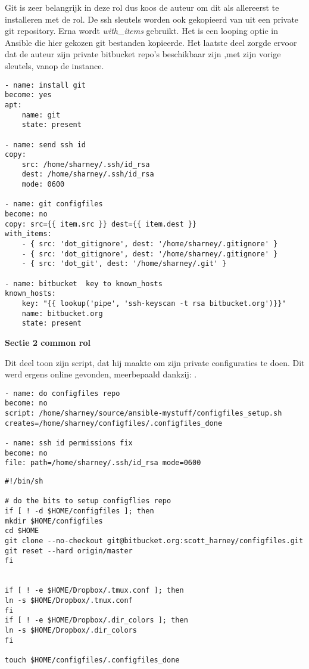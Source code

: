 Git is zeer belangrijk in deze rol dus koos de auteur om dit als allereerst te installeren met de rol. De ssh sleutels worden ook gekopieerd van uit een private git repository. Erna wordt \textit{with\_items} gebruikt. Het is een looping optie in Ansible die hier gekozen git bestanden kopieerde. Het laatste deel zorgde ervoor dat de auteur zijn private bitbucket repo's beschikbaar zijn ,met zijn vorige sleutels, vanop de instance.
\begin{lstlisting}
- name: install git
become: yes
apt:
    name: git
    state: present

- name: send ssh id
copy:
    src: /home/sharney/.ssh/id_rsa
    dest: /home/sharney/.ssh/id_rsa
    mode: 0600

- name: git configfiles
become: no
copy: src={{ item.src }} dest={{ item.dest }}
with_items:
    - { src: 'dot_gitignore', dest: '/home/sharney/.gitignore' }
    - { src: 'dot_gitignore', dest: '/home/sharney/.gitignore' }
    - { src: 'dot_git', dest: '/home/sharney/.git' }

- name: bitbucket  key to known_hosts
known_hosts:
    key: "{{ lookup('pipe', 'ssh-keyscan -t rsa bitbucket.org')}}"
    name: bitbucket.org
    state: present
\end{lstlisting}
\newpage
\textbf{Sectie 2 common rol}

Dit deel toon \autocite{commonscottharney} zijn script, dat hij maakte om zijn private configuraties te doen. Dit werd ergens online gevonden, meerbepaald dankzij: \autocite{justinellin}.
\begin{lstlisting}
- name: do configfiles repo
become: no
script: /home/sharney/source/ansible-mystuff/configfiles_setup.sh  creates=/home/sharney/configfiles/.configfiles_done

- name: ssh id permissions fix 
become: no
file: path=/home/sharney/.ssh/id_rsa mode=0600
\end{lstlisting}

\begin{lstlisting}
#!/bin/sh

# do the bits to setup configflies repo
if [ ! -d $HOME/configfiles ]; then
mkdir $HOME/configfiles 
cd $HOME
git clone --no-checkout git@bitbucket.org:scott_harney/configfiles.git
git reset --hard origin/master
fi


if [ ! -e $HOME/Dropbox/.tmux.conf ]; then 
ln -s $HOME/Dropbox/.tmux.conf
fi
if [ ! -e $HOME/Dropbox/.dir_colors ]; then
ln -s $HOME/Dropbox/.dir_colors
fi

touch $HOME/configfiles/.configfiles_done
\end{lstlisting}

